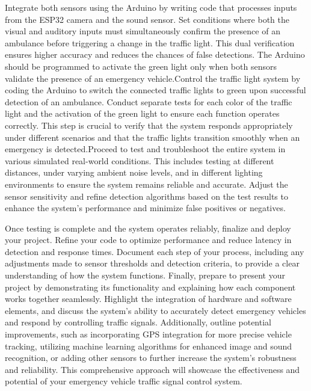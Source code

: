 \documentclass[conference]{IEEEtran}
\begin{document}
Integrate both sensors using the Arduino by writing code that processes inputs from the ESP32 camera and the sound sensor. Set conditions where both the visual and auditory inputs must simultaneously confirm the presence of an ambulance before triggering a change in the traffic light. This dual verification ensures higher accuracy and reduces the chances of false detections. The Arduino should be programmed to activate the green light only when both sensors validate the presence of an emergency vehicle.Control the traffic light system by coding the Arduino to switch the connected traffic lights to green upon successful detection of an ambulance. Conduct separate tests for each color of the traffic light and the activation of the green light to ensure each function operates correctly. This step is crucial to verify that the system responds appropriately under different scenarios and that the traffic lights transition smoothly when an emergency is detected.Proceed to test and troubleshoot the entire system in various simulated real-world conditions. This includes testing at different distances, under varying ambient noise levels, and in different lighting environments to ensure the system remains reliable and accurate. Adjust the sensor sensitivity and refine detection algorithms based on the test results to enhance the system’s performance and minimize false positives or negatives.

Once testing is complete and the system operates reliably, finalize and deploy your project. Refine your code to optimize performance and reduce latency in detection and response times. Document each step of your process, including any adjustments made to sensor thresholds and detection criteria, to provide a clear understanding of how the system functions.
Finally, prepare to present your project by demonstrating its functionality and explaining how each component works together seamlessly. Highlight the integration of hardware and software elements, and discuss the system’s ability to accurately detect emergency vehicles and respond by controlling traffic signals. Additionally, outline potential improvements, such as incorporating GPS integration for more precise vehicle tracking, utilizing machine learning algorithms for enhanced image and sound recognition, or adding other sensors to further increase the system’s robustness and reliability. This comprehensive approach will showcase the effectiveness and potential of your emergency vehicle traffic signal control system.
\end{document}
